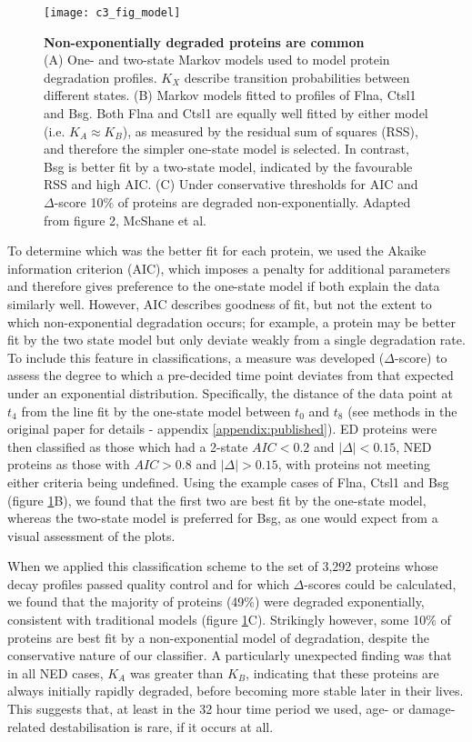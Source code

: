 \documentclass[a4paper,11pt,twoside,openright]{scrbook}
\begin{document}
\begin{figure}[h]
    \texttt{[image: c3\_fig\_model]}
    \caption[Non-exponentially degraded proteins are common]{\sffamily
    \textbf{Non-exponentially degraded proteins are common} \\ \small (A) One-
    and two-state Markov models used to model protein degradation profiles.
    $K_{X}$ describe transition probabilities between different states. (B)
    Markov models fitted to profiles of Flna, Ctsl1 and Bsg. Both Flna and Ctsl1
    are equally well fitted by either model (i.e. $K_{A} \approx K_{B}$), as
    measured by the residual sum of squares (RSS), and therefore the simpler
    one-state model is selected. In contrast, Bsg is better fit by a two-state
    model, indicated by the favourable RSS and high AIC. (C) Under conservative
    thresholds for AIC and $\Delta$-score 10\% of proteins are degraded
    non-exponentially. Adapted from figure 2, McShane et al.\cite{McShane2016}}
    \label{figure:model}
\end{figure}

To determine which was the better fit for each protein, we used the Akaike
information criterion \cite{Akaike1974} (AIC), which imposes a penalty for
additional parameters and therefore gives preference to the one-state model if
both explain the data similarly well. However, AIC describes goodness of fit,
but not the extent to which non-exponential degradation occurs; for example, a
protein may be better fit by the two state model but only deviate weakly from a
single degradation rate. To include this feature in classifications, a measure
was developed ($\Delta$-score) to assess the degree to which a pre-decided time
point deviates from that expected under an exponential distribution.
Specifically, the distance of the data point at $t_{4}$ from the line fit by the
one-state model between $t_{0}$ and $t_{8}$ (see methods in the original paper
for details - appendix \ref{appendix:published}). ED proteins were then
classified as those which had a 2-state $AIC < 0.2$ and $\lvert \Delta \rvert <
0.15$, NED proteins as those with $AIC > 0.8$ and $\lvert \Delta \rvert > 0.15$,
with proteins not meeting either criteria being undefined. Using the example
cases of Flna, Ctsl1 and Bsg (figure \ref{figure:model}B), we found that the
first two are best fit by the one-state model, whereas the two-state model is
preferred for Bsg, as one would expect from a visual assessment of the plots.

When we applied this classification scheme to the set of 3,292 proteins whose
decay profiles passed quality control and for which $\Delta$-scores could be
calculated, we found that the majority of proteins (49\%) were degraded
exponentially, consistent with traditional models (figure \ref{figure:model}C).
Strikingly however, some 10\% of proteins are best fit by a non-exponential
model of degradation, despite the conservative nature of our classifier. A
particularly unexpected finding was that in all NED cases, $K_{A}$ was greater
than $K_{B}$, indicating that these proteins are always initially rapidly
degraded, before becoming more stable later in their lives. This suggests that,
at least in the 32 hour time period we used, age- or damage-related
destabilisation is rare, if it occurs at all.
\end{document}
